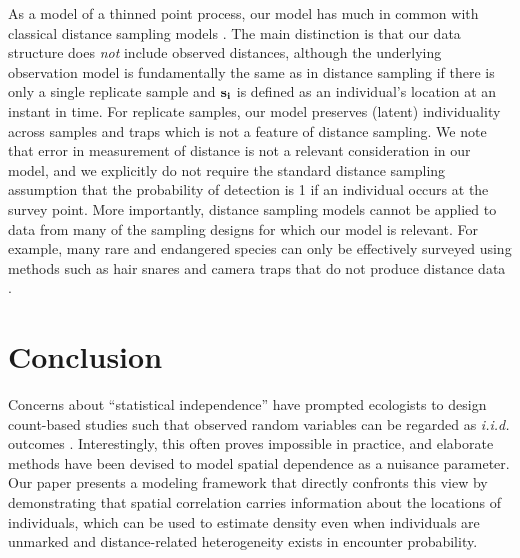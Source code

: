 As a model of a thinned point process, our model has much in common
with classical distance sampling models \citep{buckland_etal:2001}.
The main distinction is that our data structure does {\it not} include
observed distances, although the underlying observation model is
fundamentally the same as in distance sampling if there is only a
single replicate sample and $\bf{s}_i$ is defined as an individual's
location at an instant in time. For replicate samples, our model preserves
(latent) individuality across samples and traps which is not a feature
of distance sampling. We note that error in measurement of distance is
not a relevant consideration in our model, and we explicitly do not
require the standard distance sampling assumption that the probability
of detection is 1 if an individual occurs at the survey point. More
importantly, distance sampling models cannot be applied to data from
many of the sampling designs for which our model is relevant. For
example, many rare and endangered species can only be
effectively surveyed using methods such as hair snares and camera
traps that do not produce distance data \citep{oconnell_etal:2010}.


\section{Conclusion}

Concerns about ``statistical independence'' have prompted
ecologists to design count-based studies such that observed
random variables can be regarded as {\it i.i.d.} outcomes
\citep{hurlbert:1984}. Interestingly, this
often proves impossible in practice, and elaborate
methods have been devised to model spatial dependence as a nuisance
parameter. Our paper presents a modeling framework that directly
confronts this view by demonstrating that spatial
correlation carries information about the locations of individuals,
which can be used to estimate density even when individuals
are unmarked and distance-related heterogeneity exists in encounter
probability.


